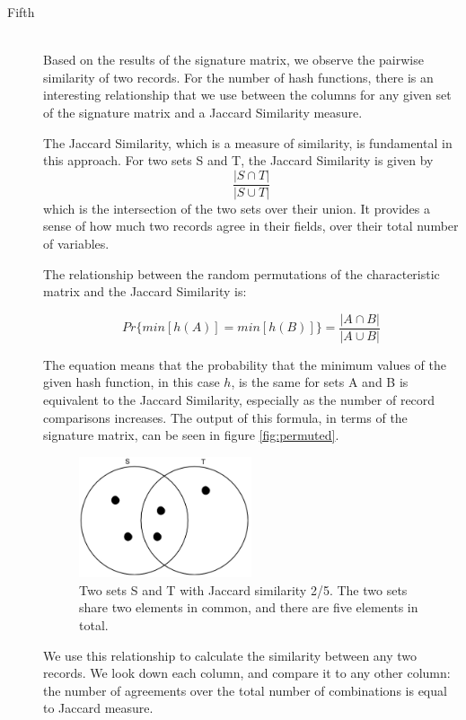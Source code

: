 \documentclass[11pt]{article}
\begin{document}
\begin{description}
\item[Fifth] \hfill \\
Based on the results of the signature matrix, we observe the pairwise similarity of two records. For the number of hash functions, there is an interesting relationship that we use between the columns for any given set of the signature matrix and a Jaccard Similarity measure.

The Jaccard Similarity, which is a measure of similarity, is fundamental in this approach. For two sets S and T, the Jaccard Similarity is given by $$\frac{|S \cap T|}{|S \cup T|}$$ which is the intersection of the two sets over their union. It provides a sense of how much two records agree in their fields, over their total number of variables.
   
The relationship between the random permutations of the characteristic matrix and the Jaccard Similarity is:

$$Pr\{min[h(A)] = min[h(B)]\} = \frac{|A \cap B|}{|A \cup B|}$$

The equation means that the probability that the minimum values of the given hash function, in this case $h$, is the same for sets A and B is equivalent to the Jaccard Similarity, especially as the number of record comparisons increases. The output of this formula, in terms of the signature matrix, can be seen in figure \ref{fig:permuted}.

\begin{figure}[htbp]
\begin{center}
\includegraphics[width=0.5\textwidth]{jaccard.png}
\caption{Two sets S and T with Jaccard similarity 2/5. The two sets share two elements in common, and there are five elements in total. }
\label{fig:jaccard}
\end{center}
\end{figure}

We use this relationship to calculate the similarity between any two records. We look down each column, and compare it to any other column: the number of agreements over the total number of combinations is equal to Jaccard measure.
 	
\end{description}
\end{document}
